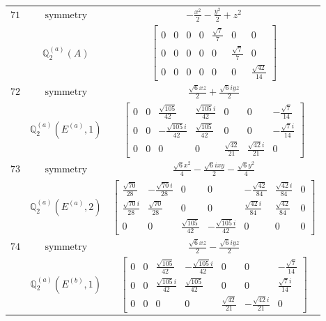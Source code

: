\documentclass[fleqn,8pt,landscape]{jsarticle}
\begin{document}
\begin{longtable}{ccc}
$ 71 $ & $ \text{symmetry} $ & $ - \frac{x^{2}}{2} - \frac{y^{2}}{2} + z^{2} $ \\
$  $ & $ \mathbb{Q}_{2}^{(a)}(A) $ & $ \begin{bmatrix} 0 & 0 & 0 & 0 & \frac{\sqrt{7}}{7} & 0 & 0 \\ 0 & 0 & 0 & 0 & 0 & \frac{\sqrt{7}}{7} & 0 \\ 0 & 0 & 0 & 0 & 0 & 0 & \frac{\sqrt{42}}{14} \end{bmatrix} $ \\ \hline
$ 72 $ & $ \text{symmetry} $ & $ \frac{\sqrt{6} x z}{2} + \frac{\sqrt{6} i y z}{2} $ \\
$  $ & $ \mathbb{Q}_{2}^{(a)}(E^{(a)},1) $ & $ \begin{bmatrix} 0 & 0 & \frac{\sqrt{105}}{42} & \frac{\sqrt{105} i}{42} & 0 & 0 & - \frac{\sqrt{7}}{14} \\ 0 & 0 & - \frac{\sqrt{105} i}{42} & \frac{\sqrt{105}}{42} & 0 & 0 & - \frac{\sqrt{7} i}{14} \\ 0 & 0 & 0 & 0 & \frac{\sqrt{42}}{21} & \frac{\sqrt{42} i}{21} & 0 \end{bmatrix} $ \\ \hline
$ 73 $ & $ \text{symmetry} $ & $ \frac{\sqrt{6} x^{2}}{4} - \frac{\sqrt{6} i x y}{2} - \frac{\sqrt{6} y^{2}}{4} $ \\
$  $ & $ \mathbb{Q}_{2}^{(a)}(E^{(a)},2) $ & $ \begin{bmatrix} \frac{\sqrt{70}}{28} & - \frac{\sqrt{70} i}{28} & 0 & 0 & - \frac{\sqrt{42}}{84} & \frac{\sqrt{42} i}{84} & 0 \\ \frac{\sqrt{70} i}{28} & \frac{\sqrt{70}}{28} & 0 & 0 & \frac{\sqrt{42} i}{84} & \frac{\sqrt{42}}{84} & 0 \\ 0 & 0 & \frac{\sqrt{105}}{42} & - \frac{\sqrt{105} i}{42} & 0 & 0 & 0 \end{bmatrix} $ \\ \hline
$ 74 $ & $ \text{symmetry} $ & $ \frac{\sqrt{6} x z}{2} - \frac{\sqrt{6} i y z}{2} $ \\
$  $ & $ \mathbb{Q}_{2}^{(a)}(E^{(b)},1) $ & $ \begin{bmatrix} 0 & 0 & \frac{\sqrt{105}}{42} & - \frac{\sqrt{105} i}{42} & 0 & 0 & - \frac{\sqrt{7}}{14} \\ 0 & 0 & \frac{\sqrt{105} i}{42} & \frac{\sqrt{105}}{42} & 0 & 0 & \frac{\sqrt{7} i}{14} \\ 0 & 0 & 0 & 0 & \frac{\sqrt{42}}{21} & - \frac{\sqrt{42} i}{21} & 0 \end{bmatrix} $ \\ \hline

\end{longtable}
\end{document}
